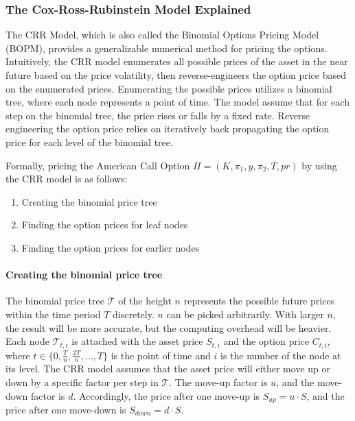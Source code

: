 \subsubsection{The Cox-Ross-Rubinstein Model Explained}

The CRR Model, which is also called the Binomial Options Pricing Model (BOPM), provides a generalizable numerical method for pricing the options.
Intuitively, the CRR model enumerates all possible prices of the asset in the near future based on the price volatility,
then reverse-engineers the option price based on the enumerated prices.
Enumerating the possible prices utilizes a binomial tree, where each node represents a point of time.
The model assume that for each step on the binomial tree, the price rises or falls by a fixed rate.
Reverse engineering the option price relies on iteratively back propagating the option price for each level of the binomial tree.

Formally, pricing the American Call Option $\Pi = (K, \pi_1, y, \pi_2, T, pr)$ by using the CRR model is as follows:

\begin{enumerate}
    \item Creating the binomial price tree
    \item Finding the option prices for leaf nodes
    \item Finding the option prices for earlier nodes 
\end{enumerate}

\paragraph{Creating the binomial price tree}
The binomial price tree $\mathcal{T}$ of the height $n$ represents the possible future prices within the time period $T$ discretely.
$n$ can be picked arbitrarily. With larger $n$, the result will be more accurate, but the computing overhead will be heavier.
Each node $\mathcal{T}_{t, i}$ is attached with the asset price $S_{t, i}$ and the option price $C_{t, i}$,
where $t \in \{0, \frac{T}{n}, \frac{2T}{n}, \dots, T\}$ is the point of time and $i$ is the number of the node at its level.
The CRR model assumes that the asset price will either move up or down by a specific factor per step in $\mathcal{T}$.
The move-up factor is $u$, and the move-down factor is $d$.
Accordingly, the price after one move-up is $S_{up} = u \cdot S$, and the price after one move-down is $S_{down} = d \cdot S$.


